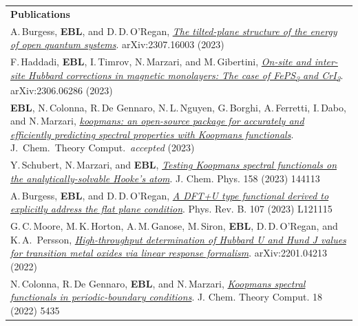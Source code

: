 \documentclass[10pt,a4paper,final]{article}
\begin{document}
\begin{tabularx}{\textwidth}{
   X}
   \rowcolor{seaborn_blue}
      \large\textcolor{seaborn_bg_grey_half}{\textbf{Publications}} \\
   \footnotesize A.\,Burgess, \textbf{EBL}, and D.\,D.\,O'Regan, \href{https://arxiv.org/abs/2307.16003}{\textit{The tilted-plane structure of the energy of open quantum systems}}. arXiv:2307.16003 (2023)
   \\
   \footnotesize F.\,Haddadi, \textbf{EBL}, I.\,Timrov, N.\,Marzari, and M.\,Gibertini, \href{https://arxiv.org/abs/2306.06286}{\textit{On-site and inter-site Hubbard corrections in magnetic monolayers: The case of FePS\textsubscript{3} and CrI\textsubscript{3}}}. arXiv:2306.06286 (2023)
   \\
   \footnotesize \textbf{EBL}, N.\,Colonna, R.\,De Gennaro, N.\,L.\,Nguyen, G.\,Borghi, A.\,Ferretti, I.\,Dabo, and N.\,Marzari, \href{https://arxiv.org/abs/2302.07759}{\textit{koopmans: an open-source package for accurately and efficiently predicting spectral properties with Koopmans functionals}}. J.\ Chem.\  Theory Comput.\ \emph{accepted} (2023)
   \\
   \footnotesize Y.\,Schubert, N.\,Marzari, and \textbf{EBL}, \href{https://doi.org/10.1063/5.0138610}{\textit{Testing Koopmans spectral functionals on the analytically-solvable Hooke's atom}}. J. Chem. Phys. 158 (2023) 144113
   \\
   \footnotesize A.\,Burgess, \textbf{EBL}, and D.\,D.\,O'Regan, \href{https://doi.org/10.1103/PhysRevB.107.L121115}{\textit{A DFT+U type functional derived to explicitly address the flat plane condition}}. Phys. Rev. B. 107 (2023) L121115
   \\
   \footnotesize G.\,C.\,Moore, M.\,K.\,Horton, A.\,M.\,Ganose, M.\,Siron, \textbf{EBL}, D.\,D.\,O'Regan, and K.\,A.\, Persson, \href{https://arxiv.org/abs/2201.04213}{\textit{High-throughput determination of Hubbard U and Hund J values for transition metal oxides via linear response formalism}}. arXiv:2201.04213 (2022) \\
   \footnotesize N.\,Colonna, R.\,De Gennaro, \textbf{EBL}, and N.\,Marzari, \href{https://pubs.acs.org/doi/10.1021/acs.jctc.2c00161}{\textit{Koopmans spectral functionals in periodic-boundary conditions}}. J. Chem. Theory Comput. 18 (2022) 5435                                                                                                                                                                                                                                                                                                                                                                                                                                                                                                                                                                \\ %

\end{tabularx}
\end{document}
